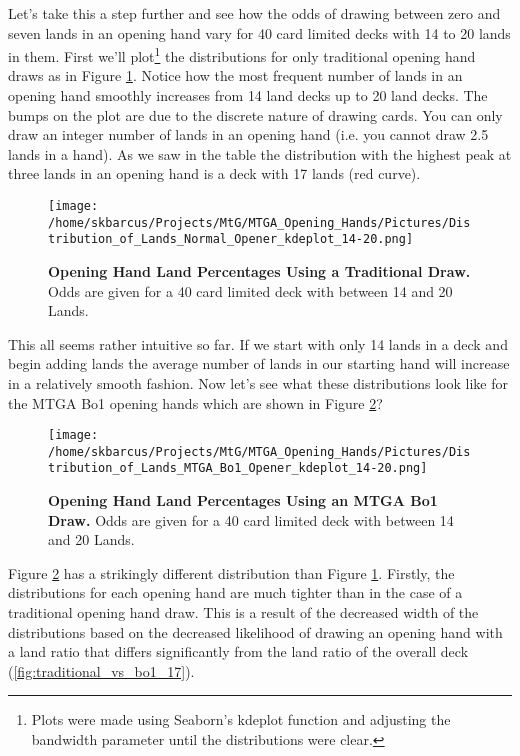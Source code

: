 \documentclass[oneside]{book}   %
\begin{document}
Let's take this a step further and see how the odds of drawing between zero and seven lands in an opening hand vary for 40 card limited decks with 14 to 20 lands in them. First we'll plot\footnote{Plots were made using Seaborn's kdeplot function and adjusting the bandwidth parameter until the distributions were clear.} the distributions for only traditional opening hand draws as in Figure \ref{fig:traditional_distributions}. Notice how the most frequent number of lands in an opening hand smoothly increases from 14 land decks up to 20 land decks. The bumps on the plot are due to the discrete nature of drawing cards. You can only draw an integer number of lands in an opening hand (i.e. you cannot draw 2.5 lands in a hand). As we saw in the table the distribution with the highest peak at three lands in an opening hand is a deck with 17 lands (red curve).

 	\begin{figure}[!ht]
	\centering
	\centerline{\texttt{[image: /home/skbarcus/Projects/MtG/MTGA\_Opening\_Hands/Pictures/Distribution\_of\_Lands\_Normal\_Opener\_kdeplot\_14-20.png]}}
	\caption{
	{\bf{Opening Hand Land Percentages Using a Traditional Draw.}} Odds are given for a 40 card limited deck with between 14 and 20 Lands.}
	\label{fig:traditional_distributions}
	\end{figure}	

This all seems rather intuitive so far. If we start with only 14 lands in a deck and begin adding lands the average number of lands in our starting hand will increase in a relatively smooth fashion. Now let's see what these distributions look like for the MTGA Bo1 opening hands which are shown in Figure \ref{fig:bo1_distributions}? 

 	\begin{figure}[!ht]
	\centering
	\centerline{\texttt{[image: /home/skbarcus/Projects/MtG/MTGA\_Opening\_Hands/Pictures/Distribution\_of\_Lands\_MTGA\_Bo1\_Opener\_kdeplot\_14-20.png]}}
	\caption{
	{\bf{Opening Hand Land Percentages Using an MTGA Bo1 Draw.}} Odds are given for a 40 card limited deck with between 14 and 20 Lands.}
	\label{fig:bo1_distributions}
	\end{figure}	
	
Figure \ref{fig:bo1_distributions} has a strikingly different distribution than Figure \ref{fig:traditional_distributions}. Firstly, the distributions for each opening hand are much tighter than in the case of a traditional opening hand draw. This is a result of the decreased width of the distributions based on the decreased likelihood of drawing an opening hand with a land ratio that differs significantly from the land ratio of the overall deck (\ref{fig:traditional_vs_bo1_17}). 
\end{document}

